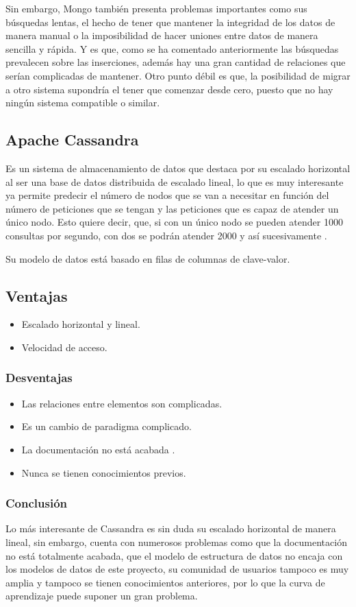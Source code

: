 Sin embargo, Mongo también presenta problemas importantes como sus búsquedas lentas, el hecho de tener que mantener la integridad de los datos de manera manual o la imposibilidad de hacer uniones entre datos de manera sencilla y rápida. Y es que, como se ha comentado anteriormente las búsquedas prevalecen sobre las inserciones, además hay una gran cantidad de relaciones que serían complicadas de mantener.
Otro punto débil es que, la posibilidad de migrar a otro sistema supondría el tener que comenzar desde cero, puesto que no hay ningún sistema compatible o similar. 

\subsection{Apache Cassandra}
Es un sistema de almacenamiento de datos que destaca por su escalado horizontal al ser una base de datos distribuida de escalado lineal, lo que es muy interesante ya permite predecir el número de nodos que se van a necesitar en función del número de peticiones que se tengan y las peticiones que es capaz de atender un único nodo. Esto quiere decir, que, si con un único nodo se pueden atender 1000 consultas por segundo, con dos se podrán atender 2000 y así sucesivamente \cite{Apache_Cassandra}. 

Su modelo de datos está basado en filas de columnas de clave-valor. 
\subsection{Ventajas}
\begin{itemize}
    \item Escalado horizontal y lineal.
    \item Velocidad de acceso.
\end{itemize}
\subsubsection{Desventajas}
\begin{itemize}
    \item Las relaciones entre elementos son complicadas.
    \item Es un cambio de paradigma complicado.
    \item La documentación no está acabada \cite{Apache_Cassandra_docu}.
    \item Nunca se tienen conocimientos previos.
\end{itemize}
\subsubsection{Conclusión}
Lo más interesante de Cassandra es sin duda su escalado horizontal de manera lineal, sin embargo, cuenta con numerosos problemas como que la documentación no está totalmente acabada, que el modelo de estructura de datos no encaja con los modelos de datos de este proyecto, su comunidad de usuarios tampoco es muy amplia y tampoco se tienen conocimientos anteriores, por lo que la curva de aprendizaje puede suponer un gran problema. 

